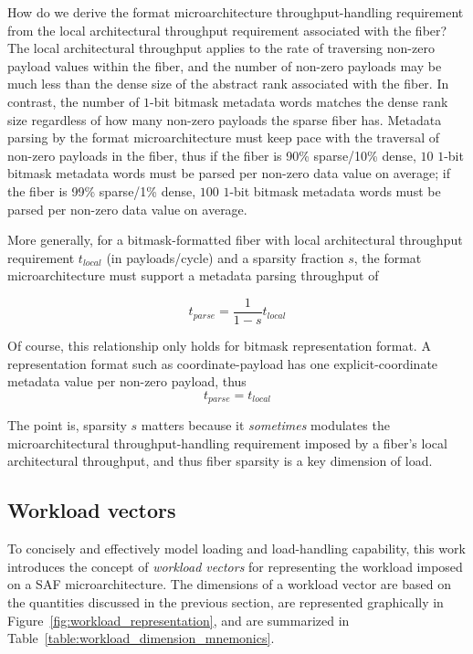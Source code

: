 \begin{itemize}
    How do we derive the format microarchitecture throughput-handling requirement from the local architectural throughput requirement associated with the fiber? The local architectural throughput applies to the rate of traversing non-zero payload values within the fiber, and the number of non-zero payloads may be much less than the dense size of the abstract rank associated with the fiber. In contrast, the number of $1$-bit bitmask metadata words matches the dense rank size regardless of how many non-zero payloads the sparse fiber has. Metadata parsing by the format microarchitecture must keep pace with the traversal of non-zero payloads in the fiber, thus if the fiber is 90\% sparse/10\% dense, $10$ $1$-bit bitmask metadata words must be parsed per non-zero data value on average; if the fiber is 99\% sparse/1\% dense, $100$ $1$-bit bitmask metadata words must be parsed per non-zero data value on average.

    More generally, for a bitmask-formatted fiber with local architectural throughput requirement $t_{local}$ (in payloads/cycle) and a sparsity fraction $s$, the format microarchitecture must support a metadata parsing throughput of

    \[t_{parse} = \frac{1}{1-s}t_{local}\]

    Of course, this relationship only holds for bitmask representation format. A representation format such as coordinate-payload has one explicit-coordinate metadata value per non-zero payload, thus \[t_{parse} = t_{local}\]

    The point is, sparsity $s$ matters because it \textit{sometimes} modulates the microarchitectural throughput-handling requirement imposed by a fiber's local architectural throughput, and thus fiber sparsity is a key dimension of load.
\end{itemize}

\subsection{Workload vectors}
\label{sec:loadspaces}

To concisely and effectively model loading and load-handling capability, this work introduces the concept of \textit{workload vectors} for representing the workload imposed on a SAF microarchitecture. The dimensions of a workload vector are based on the quantities discussed in the previous section, are represented graphically in Figure~\ref{fig:workload_representation}, and are summarized in Table~\ref{table:workload_dimension_mnemonics}.


